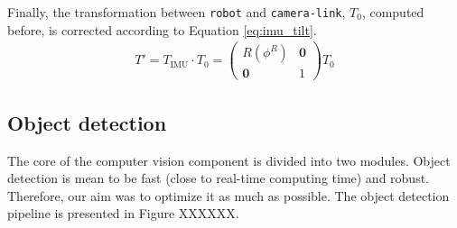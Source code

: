 Finally, the transformation between \texttt{robot} and \texttt{camera-link}, $T_0$, computed before, is corrected according to Equation \ref{eq:imu_tilt}.
\begin{align}
\label{eq:imu_tilt}
T' = T_{\text{IMU}} \cdot T_0 = 
\begin{pmatrix}
R(\phi^R) & \textbf{0}\\
\textbf{0} & 1 
\end{pmatrix} T_0
\end{align}

\subsection{Object detection}
\label{sec:Object detection}
The core of the computer vision component is divided into two modules. Object detection is mean to be fast (close to real-time computing time) and robust. Therefore, our aim was to optimize it as much as possible. The object detection pipeline is presented in Figure XXXXXX.


